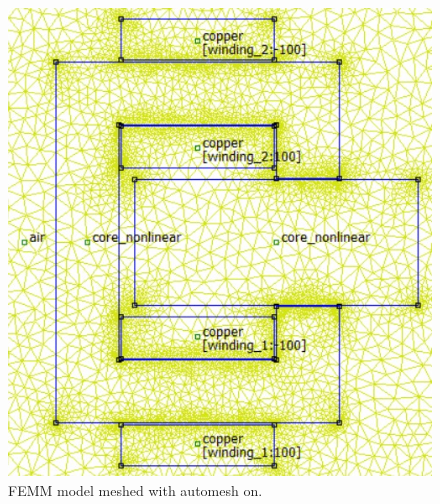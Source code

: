 \documentclass[a4paper]{IEEEtran}
\begin{document}
{\begin{figure}[!ht]
\begin{centering}
\includegraphics[scale=0.5]{automeshing.jpg} 
\par\end{centering}   
\caption{FEMM model meshed with automesh on.\label{automesh}}
\end{figure} 

}
\end{document}
